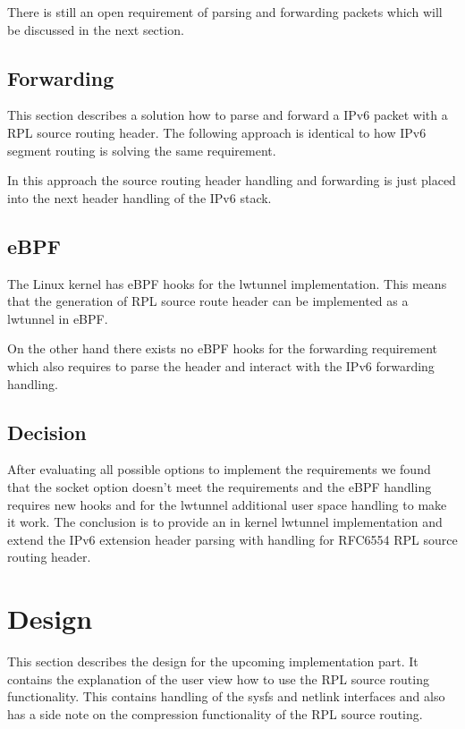 \documentclass[letterpaper]{article}
\begin{document}
There is still an open requirement of parsing and forwarding packets which will be discussed in the next section.

\subsection{Forwarding}

This section describes a solution how to parse and forward a IPv6 packet with a RPL source routing header.
The following approach is identical to how IPv6 segment routing \cite{srh} is solving the same requirement.

In this approach the source routing header handling and forwarding is just placed into the next header handling of the IPv6 stack.

\subsection{eBPF}

The Linux kernel has eBPF hooks for the lwtunnel implementation.
This means that the generation of RPL source route header can be implemented as a lwtunnel in eBPF.

On the other hand there exists no eBPF hooks for the forwarding requirement which also requires to parse the header and interact with the IPv6 forwarding handling.

\subsection{Decision}

After evaluating all possible options to implement the requirements we found
that the socket option doesn't meet the requirements and the eBPF handling requires new hooks and for the lwtunnel additional user space handling to make it work.
The conclusion is to provide an in kernel lwtunnel implementation and extend the IPv6 extension header parsing with handling for RFC6554 RPL source routing header.

\section{Design}

This section describes the design for the upcoming implementation part.
It contains the explanation of the user view how to use the RPL source routing functionality.
This contains handling of the sysfs and netlink interfaces and also has a side
note on the compression functionality of the RPL source routing.
\end{document}
